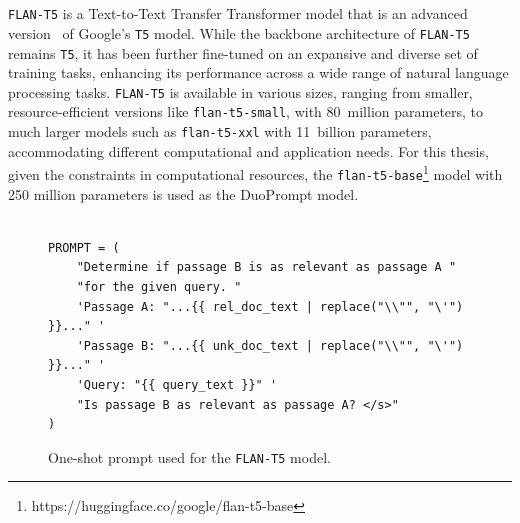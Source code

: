 \\\\
\texttt{FLAN-T5} is a Text-to-Text Transfer Transformer model that is an advanced version~\citep{chung:2022} of Google's \texttt{T5} model. While the backbone architecture of \texttt{FLAN-T5} remains \texttt{T5}, it has been further fine-tuned on an expansive and diverse set of training tasks, enhancing its performance across a wide range of natural language processing tasks. \texttt{FLAN-T5} is available in various sizes, ranging from smaller, resource-efficient versions like \texttt{flan-t5-small}, with 80~million parameters, to much larger models such as \texttt{flan-t5-xxl} with 11~billion parameters, accommodating different computational and application needs. For this thesis, given the constraints in computational resources, the \texttt{flan-t5-base}\footnote{https://huggingface.co/google/flan-t5-base} model with 250 million parameters is used as the DuoPrompt model.
\\\\
\begin{figure}[ht]
    \centering
    \begin{tcolorbox}[title=One-Shot Prompt]
        \footnotesize
        \begin{verbatim}
PROMPT = (
    "Determine if passage B is as relevant as passage A "
    "for the given query. "
    'Passage A: "...{{ rel_doc_text | replace("\\"", "\'") }}..." '
    'Passage B: "...{{ unk_doc_text | replace("\\"", "\'") }}..." '
    'Query: "{{ query_text }}" '
    "Is passage B as relevant as passage A? </s>"
)
        \end{verbatim}
    \end{tcolorbox}
    \caption{One-shot prompt used for the \texttt{FLAN-T5} model.}
    \label{fig:oneshot-prompt}
\end{figure}

